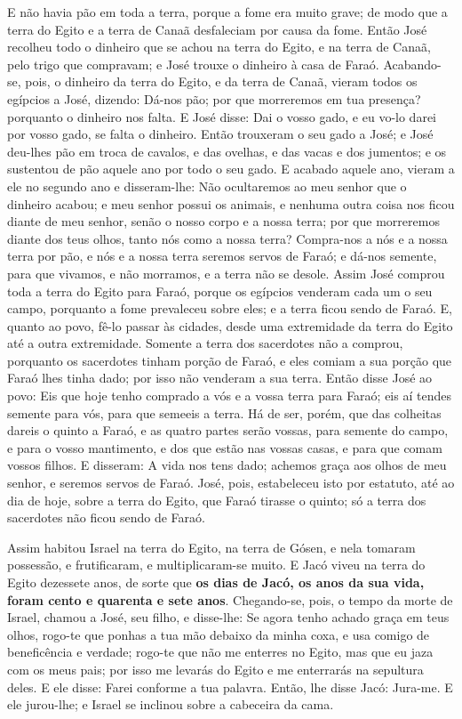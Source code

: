 E não havia pão em toda a terra, porque a fome era muito grave;
de modo que a terra do Egito e a terra de Canaã desfaleciam por
causa da fome. Então José recolheu todo o dinheiro que se
achou na terra do Egito, e na terra de Canaã, pelo trigo que
compravam; e José trouxe o dinheiro à casa de Faraó.
Acabando-se, pois, o dinheiro da terra do Egito, e da terra
de Canaã, vieram todos os egípcios a José, dizendo: Dá-nos pão; por
que morreremos em tua presença? porquanto o dinheiro nos falta.
E José disse: Dai o vosso gado, e eu vo-lo darei por vosso
gado, se falta o dinheiro. Então trouxeram o seu gado a José;
e José deu-lhes pão em troca de cavalos, e das ovelhas, e das vacas
e dos jumentos; e os sustentou de pão aquele ano por todo o seu
gado. E acabado aquele ano, vieram a ele no segundo ano e
disseram-lhe: Não ocultaremos ao meu senhor que o dinheiro acabou; e
meu senhor possui os animais, e nenhuma outra coisa nos ficou diante
de meu senhor, senão o nosso corpo e a nossa terra; por que
morreremos diante dos teus olhos, tanto nós como a nossa terra?
Compra-nos a nós e a nossa terra por pão, e nós e a nossa terra
seremos servos de Faraó; e dá-nos semente, para que vivamos, e não
morramos, e a terra não se desole. Assim José comprou toda a
terra do Egito para Faraó, porque os egípcios venderam cada um o seu
campo, porquanto a fome prevaleceu sobre eles; e a terra ficou sendo
de Faraó. E, quanto ao povo, fê-lo passar às cidades, desde
uma extremidade da terra do Egito até a outra extremidade.
Somente a terra dos sacerdotes não a comprou, porquanto os
sacerdotes tinham porção de Faraó, e eles comiam a sua porção que
Faraó lhes tinha dado; por isso não venderam a sua terra.
Então disse José ao povo: Eis que hoje tenho comprado a vós e
a vossa terra para Faraó; eis aí tendes semente para vós, para que
semeeis a terra. Há de ser, porém, que das colheitas dareis o
quinto a Faraó, e as quatro partes serão vossas, para semente do
campo, e para o vosso mantimento, e dos que estão nas vossas casas,
e para que comam vossos filhos. E disseram: A vida nos tens
dado; achemos graça aos olhos de meu senhor, e seremos servos de
Faraó. José, pois, estabeleceu isto por estatuto, até ao dia
de hoje, sobre a terra do Egito, que Faraó tirasse o quinto; só a
terra dos sacerdotes não ficou sendo de Faraó.

Assim habitou Israel na terra do Egito, na terra de Gósen, e nela
tomaram possessão, e frutificaram, e multiplicaram-se muito.
E Jacó viveu na terra do Egito dezessete anos, de sorte que
\textbf{os dias de Jacó, os anos da sua vida, foram cento e quarenta
e sete anos}. Chegando-se, pois, o tempo da morte de Israel,
chamou a José, seu filho, e disse-lhe: Se agora tenho achado graça
em teus olhos, rogo-te que ponhas a tua mão debaixo da minha coxa, e
usa comigo de beneficência e verdade; rogo-te que não me enterres no
Egito, mas que eu jaza com os meus pais; por isso me levarás
do Egito e me enterrarás na sepultura deles. E ele disse: Farei
conforme a tua palavra. Então, lhe disse Jacó: Jura-me. E ele
jurou-lhe; e Israel se inclinou sobre a cabeceira da cama.


